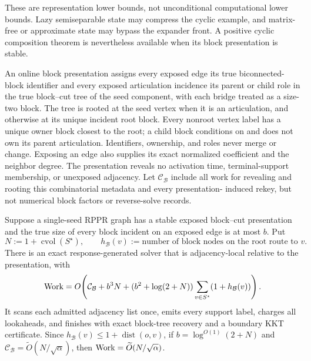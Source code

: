 These are representation lower bounds, not unconditional computational
lower bounds.  Lazy semiseparable state may compress the cyclic example, and
matrix-free or approximate state may bypass the expander front.  A positive
cyclic composition theorem is nevertheless available when its block
presentation is stable.

\begin{definition}
\label{def:stable-block-presentation}
An online block presentation assigns every exposed edge its true
biconnected-block identifier and every exposed articulation incidence its
parent or child role in the true block--cut tree of the seed component, with
each bridge treated as a size-two block.  The tree is rooted at the seed
vertex when it is an articulation, and otherwise at its unique incident root
block.  Every nonroot vertex label has a unique owner block closest to the
root; a child block conditions on and does not own its parent articulation.
Identifiers, ownership, and roles never merge or change.  Exposing an edge
also supplies its exact normalized coefficient and the neighbor degree.  The
presentation reveals no activation time, terminal-support membership, or
unexposed adjacency.  Let $\mathcal C_{\mathcal B}$ include all work for
revealing and rooting this combinatorial metadata and every presentation-
induced rekey, but not numerical block factors or reverse-solve records.
\end{definition}

\begin{theorem}
\label{thm:stable-bounded-block-response}
Suppose a single-seed RPPR graph has a stable exposed block--cut presentation
and the true size of every block incident on an exposed edge is at most $b$.
Put
\begin{equation*}
 N:=1+\operatorname{cvol}(S^\star),
 \qquad
 h_{\mathcal B}(v):=\text{number of block nodes on the root route to $v$}.
\end{equation*}
There is an exact response-generated solver that is adjacency-local relative
to the presentation, with
\begin{equation}
 \operatorname{Work}=O\!\left(
  \mathcal C_{\mathcal B}+b^3N
  +(b^2+\log(2+N))
    \sum_{v\in S^\star}(1+h_{\mathcal B}(v))
 \right).
 \label{eq:stable-bounded-block-work}
\end{equation}
It scans each admitted adjacency list once, emits every support label, charges
all lookaheads, and finishes with exact block-tree recovery and a boundary
KKT certificate.  Since
$h_{\mathcal B}(v)\leq1+\operatorname{dist}(o,v)$, if
$b=\log^{O(1)}(2+N)$ and
$\mathcal C_{\mathcal B}=\widetilde O(N/\sqrt\alpha)$, then
$\operatorname{Work}=\widetilde O(N/\sqrt\alpha)$.
\end{theorem}

